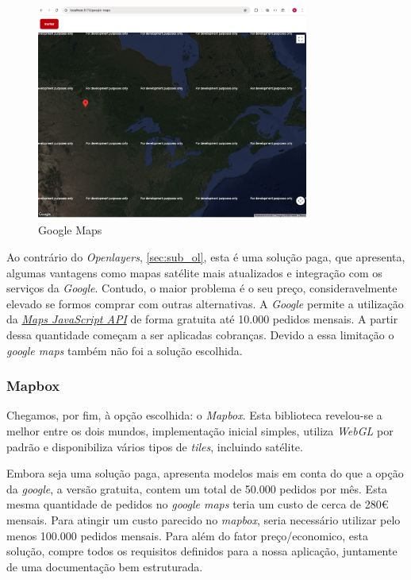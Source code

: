 \begin{figure}[h!]
    \centering
    \includegraphics[width=8.95cm]{figs/gm.png}
    \caption[Google maps]{Google Maps}
    \label{fig:gm}
\end{figure}

Ao contrário do \textit{Openlayers}, \ref{sec:sub_ol}, esta é uma solução paga, que apresenta, algumas vantagens como mapas satélite mais atualizados e integração com os serviços da \textit{Google}. Contudo, o maior problema é o seu preço, consideravelmente elevado se formos comprar com outras alternativas. A \textit{Google} permite a utilização da \href{https://developers.google.com/maps/documentation/javascript}{\textit{Maps JavaScript API}} de forma gratuita até 10.000 pedidos mensais. A partir dessa quantidade começam a ser aplicadas cobranças. Devido a essa limitação o \textit{google maps} também não foi a solução escolhida.

\vspace{0.5cm}

\subsubsection{\textbf{Mapbox}}\label{sec:mapbox}
Chegamos, por fim, à opção escolhida: o \textit{Mapbox}. Esta biblioteca revelou-se a melhor entre os dois mundos, implementação inicial simples, utiliza \textit{WebGL} por padrão e disponibiliza vários tipos de \textit{tiles}, incluindo satélite. 

Embora seja uma solução paga, apresenta modelos mais em conta do que a opção da \textit{google}, a versão gratuita, contem um total de 50.000 pedidos por mês. Esta mesma quantidade de pedidos no \textit{google maps} teria um custo de cerca de 280€ mensais. Para atingir um custo parecido no \textit{mapbox}, seria necessário utilizar pelo menos 100.000 pedidos mensais. Para além do fator preço/economico, esta solução, compre todos os requisitos definidos para a nossa aplicação, juntamente de uma documentação bem estruturada.

